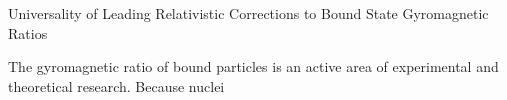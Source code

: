 Universality of Leading Relativistic Corrections to Bound State Gyromagnetic Ratios

The gyromagnetic ratio of bound particles is an active area of experimental and theoretical research.  Because nuclei 